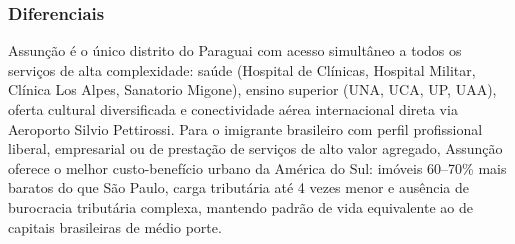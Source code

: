 \subsubsection*{Diferenciais}\label{dif-asuncion-0000}
Assunção é o único distrito do Paraguai com acesso simultâneo a todos os serviços de alta complexidade: saúde (Hospital de Clínicas, Hospital Militar, Clínica Los Alpes, Sanatorio Migone), ensino superior (UNA, UCA, UP, UAA), oferta cultural diversificada e conectividade aérea internacional direta via Aeroporto Silvio Pettirossi. Para o imigrante brasileiro com perfil profissional liberal, empresarial ou de prestação de serviços de alto valor agregado, Assunção oferece o melhor custo-benefício urbano da América do Sul: imóveis 60--70\% mais baratos do que São Paulo, carga tributária até 4 vezes menor e ausência de burocracia tributária complexa, mantendo padrão de vida equivalente ao de capitais brasileiras de médio porte.
